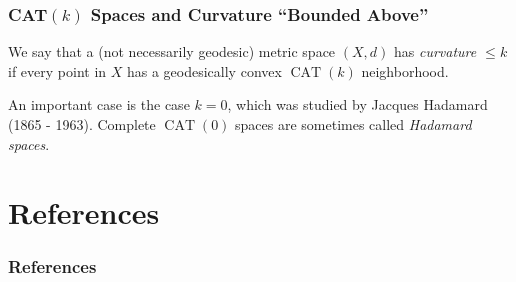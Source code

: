 \documentclass[handout]{beamer}
\DeclareMathOperator{\CAT}{CAT}
\theoremstyle{definition}
\begin{document}
\begin{frame}
    \frametitle{CAT$(k)$ Spaces and Curvature ``Bounded Above''}

    \pause
    \begin{definition}
        We say that a (not necessarily geodesic) metric space $(X,d)$ has \emph{curvature $\leq k$}
        if every point in $X$ has a geodesically convex $\CAT(k)$ neighborhood.
    \end{definition}

    \pause
    An important case is the case $k = 0$, which was studied by Jacques Hadamard (1865 - 1963).
    Complete $\CAT(0)$ spaces are sometimes called \emph{Hadamard spaces}.

\end{frame}

\section{References}

\begin{frame}
    \frametitle{References}

    \printbibliography

\end{frame}
\end{document}
